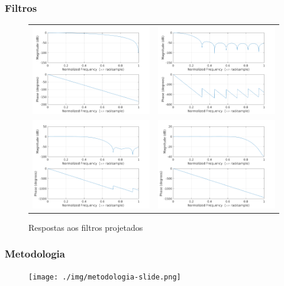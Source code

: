 \documentclass[brazil]{beamer}
\begin{document}
\begin{frame}
\frametitle{Filtros}
      \begin{figure}
\centering
      \begin{tabular}{cc}
\includegraphics[width=0.35\linewidth]{./img/filter-response-hanningFilter.png} &
\includegraphics[width=0.35\linewidth]{./img/filter-response-wc_0_1pi.png} \\
\includegraphics[width=0.35\linewidth]{./img/filter-response-wc_0_5pi.png} &
\includegraphics[width=0.35\linewidth]{./img/filter-response-wc_0_8pi.png} \\
	\end{tabular}
	\caption{Respostas aos filtros projetados}
     \end{figure}  
      
\end{frame}

\begin{frame}
	\frametitle{Metodologia}
      \begin{figure}
        \centering
        \texttt{[image: ./img/metodologia-slide.png]}
      \end{figure}   
\end{frame}
\end{document}
